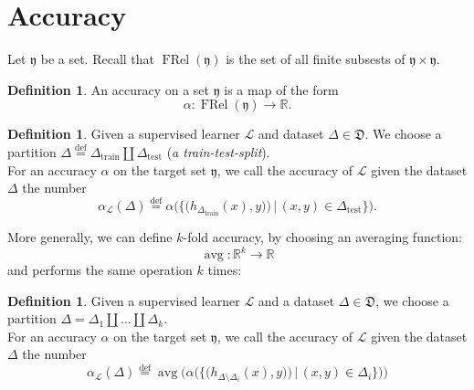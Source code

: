 \documentclass{book}
\theoremstyle{plain}
\theoremstyle{definition}
\newtheorem{definition}[corollary]{Definition}
\DeclareMathOperator{\avg}{avg}
\renewcommand{\d}[1]{\mathbb{#1}}
\newcommand{\define}{\stackrel{\operatorname{def}}{=}}
\newcommand{\f}[1]{\mathfrak{#1}}
\DeclareMathOperator{\FRel}{FRel}
\newcommand{\mor}{\longrightarrow}
\renewcommand{\r}[1]{\mathcal{#1}}
\DeclareMathOperator{\test}{test}
\DeclareMathOperator{\train}{train}
\begin{document}
\section{Accuracy}
Let $\f{y}$ be a set. Recall that $\FRel(\f{y})$ is the set of all finite subsests of $\f{y}\times \f{y}$.
\begin{definition}
An accuracy on a set $\f{y}$ is a map of the form
\[
\alpha: \FRel(\f{y})\mor \d{R}.
\]
\end{definition}
\begin{definition}
Given a supervised learner $\r{L}$ and dataset $\Delta \in \f{D}$. We choose a partition $\Delta \define \Delta_{\train}\coprod \Delta_{\test}$ (\emph{a train-test-split}).\\
For an accuracy $\alpha$ on the target set $\f{y}$, we call the accuracy of $\r{L}$ given the dataset $\Delta$ the number
\[
\alpha_\r{L}(\Delta)\define \alpha  \bigg(  \big\{ \big( h_{\Delta_{\train}}  (x),y)  \big) \,\bigg\vert \,(x,y)\in \Delta_{\test} \big\}\bigg).
\]
\end{definition}

\noindent More generally, we can define $k$-fold accuracy, by choosing an averaging function:
\[
\avg: \d{R}^k\mor \d{R}
\]
and performs the same operation $k$ times:
\begin{definition}
Given a supervised learner $\r{L}$ and a dataset $\Delta \in \f{D}$, we choose a partition $\Delta = \Delta_1 \coprod \ldots \coprod \Delta_k$.\\
For an accuracy $\alpha$ on the target set $\f{y}$, we call the accuracy of $\r{L}$ given the dataset $\Delta$ the number
\[
\alpha_\r{L}(\Delta)\define \avg\bigg(\alpha\big(\big\{ \big( h_{\Delta\setminus \Delta_i}(x),y)  \big) \,\bigg\vert \,(x,y)\in \Delta_i \big\}\big)\bigg)
\]
\end{definition}
\end{document}
